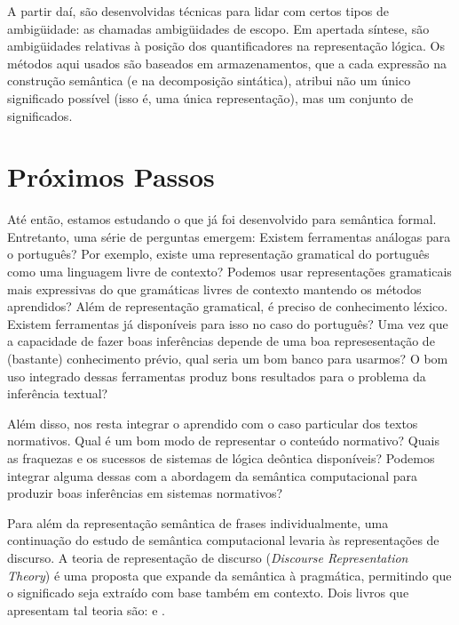 \documentclass[12pt, a4paper, twoside]{article}
\begin{document}
A partir daí, são desenvolvidas técnicas para lidar com certos tipos de ambigüidade: as chamadas ambigüidades de escopo. Em apertada síntese, são ambigüidades relativas à posição dos quantificadores na representação lógica. Os métodos aqui usados são baseados em armazenamentos, que a cada expressão na construção semântica (e na decomposição sintática), atribui não um único significado possível (isso é, uma única representação), mas um conjunto de significados.

\newpage

\section{Próximos Passos}

Até então, estamos estudando o que já foi desenvolvido para semântica formal. Entretanto, uma série de perguntas emergem:
Existem ferramentas análogas para o português? Por exemplo, existe uma representação gramatical do português como uma linguagem livre de contexto? Podemos usar representações gramaticais mais expressivas do que gramáticas livres de contexto mantendo os métodos aprendidos? Além de representação gramatical, é preciso de conhecimento léxico. Existem ferramentas já disponíveis para isso no caso do português? Uma vez que a capacidade de fazer boas inferências depende de uma boa represesentação de (bastante) conhecimento prévio, qual seria um bom banco para usarmos? O bom uso integrado dessas ferramentas produz bons resultados para o problema da inferência textual?

Além disso, nos resta integrar o aprendido com o caso particular dos textos normativos. Qual é um bom modo de representar o conteúdo normativo? Quais as fraquezas e os sucessos de sistemas de lógica deôntica disponíveis? Podemos integrar alguma dessas com a abordagem da semântica computacional para produzir boas inferências em sistemas normativos?

Para além da representação semântica de frases individualmente, uma continuação do estudo de semântica computacional levaria às representações de discurso. A teoria de representação de discurso (\textit{Discourse Representation Theory}) é uma proposta que expande da semântica à pragmática, permitindo que o significado seja extraído com base também em contexto. Dois livros que apresentam tal teoria são: \citet{BlackburnBos:DRT} e \citet{vanEijck:2010}.

\newpage

%



\end{document}

